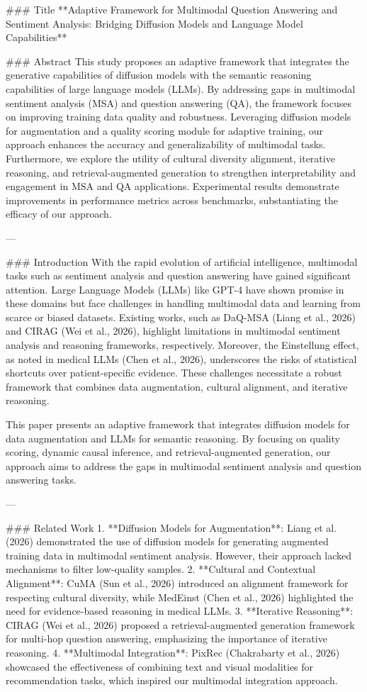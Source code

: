 ### Title
**Adaptive Framework for Multimodal Question Answering and Sentiment Analysis: Bridging Diffusion Models and Language Model Capabilities**

### Abstract
This study proposes an adaptive framework that integrates the generative capabilities of diffusion models with the semantic reasoning capabilities of large language models (LLMs). By addressing gaps in multimodal sentiment analysis (MSA) and question answering (QA), the framework focuses on improving training data quality and robustness. Leveraging diffusion models for augmentation and a quality scoring module for adaptive training, our approach enhances the accuracy and generalizability of multimodal tasks. Furthermore, we explore the utility of cultural diversity alignment, iterative reasoning, and retrieval-augmented generation to strengthen interpretability and engagement in MSA and QA applications. Experimental results demonstrate improvements in performance metrics across benchmarks, substantiating the efficacy of our approach.

---

### Introduction
With the rapid evolution of artificial intelligence, multimodal tasks such as sentiment analysis and question answering have gained significant attention. Large Language Models (LLMs) like GPT-4 have shown promise in these domains but face challenges in handling multimodal data and learning from scarce or biased datasets. Existing works, such as DaQ-MSA (Liang et al., 2026) and CIRAG (Wei et al., 2026), highlight limitations in multimodal sentiment analysis and reasoning frameworks, respectively. Moreover, the Einstellung effect, as noted in medical LLMs (Chen et al., 2026), underscores the risks of statistical shortcuts over patient-specific evidence. These challenges necessitate a robust framework that combines data augmentation, cultural alignment, and iterative reasoning.

This paper presents an adaptive framework that integrates diffusion models for data augmentation and LLMs for semantic reasoning. By focusing on quality scoring, dynamic causal inference, and retrieval-augmented generation, our approach aims to address the gaps in multimodal sentiment analysis and question answering tasks.

---

### Related Work
1. **Diffusion Models for Augmentation**: Liang et al. (2026) demonstrated the use of diffusion models for generating augmented training data in multimodal sentiment analysis. However, their approach lacked mechanisms to filter low-quality samples.
2. **Cultural and Contextual Alignment**: CuMA (Sun et al., 2026) introduced an alignment framework for respecting cultural diversity, while MedEinst (Chen et al., 2026) highlighted the need for evidence-based reasoning in medical LLMs.
3. **Iterative Reasoning**: CIRAG (Wei et al., 2026) proposed a retrieval-augmented generation framework for multi-hop question answering, emphasizing the importance of iterative reasoning.
4. **Multimodal Integration**: PixRec (Chakrabarty et al., 2026) showcased the effectiveness of combining text and visual modalities for recommendation tasks, which inspired our multimodal integration approach.

